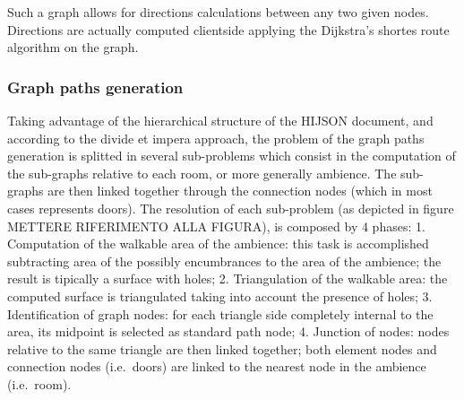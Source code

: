 \documentclass{sig-alternate}
\begin{document}
Such a graph allows for directions calculations between any two given
nodes. Directions are actually computed clientside applying the
Dijkstra's shortes route algorithm on the graph.

\subsubsection{Graph paths generation}\label{graph-paths-generation}

Taking advantage of the hierarchical structure of the HIJSON document,
and according to the divide et impera approach, the problem of the graph
paths generation is splitted in several sub-problems which consist in
the computation of the sub-graphs relative to each room, or more
generally ambience. The sub-graphs are then linked together through the
connection nodes (which in most cases represents doors). The resolution
of each sub-problem (as depicted in figure METTERE RIFERIMENTO ALLA
FIGURA), is composed by 4 phases: 1. Computation of the walkable area of
the ambience: this task is accomplished subtracting area of the possibly
encumbrances to the area of the ambience; the result is tipically a
surface with holes; 2. Triangulation of the walkable area: the computed
surface is triangulated taking into account the presence of holes; 3.
Identification of graph nodes: for each triangle side completely
internal to the area, its midpoint is selected as standard path node; 4.
Junction of nodes: nodes relative to the same triangle are then linked
together; both element nodes and connection nodes (i.e.~doors) are
linked to the nearest node in the ambience (i.e.~room).
\end{document}
